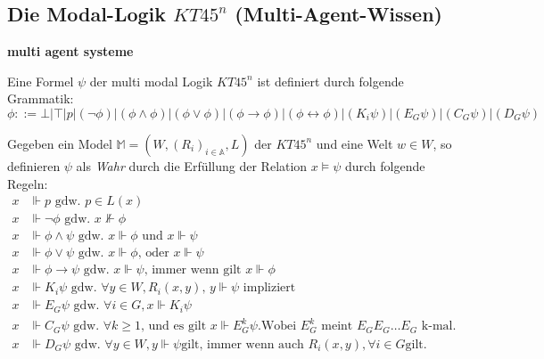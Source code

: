 
\subsection{Die Modal-Logik $KT45^n$ (Multi-Agent-Wissen)} %
\label{sub:the_modal_logic_kt45_n_}

\textbf{multi agent systeme}
\begin{definition}
	\label{def:bnf_kt45n}
	Eine Formel $\psi$ der multi modal Logik $KT45^n$ ist definiert durch folgende Grammatik:
	\begin{equation}
		\label{eqn:bnf_kt45n}
		\phi ::= \bot|\top|p|(\neg\phi)|(\phi\wedge\phi)|(\phi\vee\phi)|(\phi\rightarrow\phi)|
		(\phi\leftrightarrow\phi)|(K_i\psi)|(E_G\psi)|(C_G\psi)|(D_G\psi)
	\end{equation}
\end{definition}
\cite[S.335f]{huth2004logic}

\begin{definition}
		Gegeben ein Model $\mathds{M} = (W,(R_i)_{i \in \mathds{A}}, L)$ der $KT45^n$ und eine Welt $w \in W$, so definieren $\psi$ als \emph{Wahr} durch die Erfüllung der Relation $x \vDash \psi$ durch folgende Regeln:
		\begin{align}
			x &\Vdash p\text{ gdw. }p \in L(x)\\
			x &\Vdash \neg \phi\text{ gdw. }x \nVdash \phi\\
			x &\Vdash \phi \wedge \psi\text{ gdw. }x \Vdash \phi\text{ und } x \Vdash \psi\\
			x &\Vdash \phi \vee \psi\text{ gdw. }x \Vdash \phi \text{, oder } x \Vdash \psi\\
			x &\Vdash \phi \rightarrow \psi\text{ gdw. }x \Vdash \psi\text{, immer wenn gilt }x \Vdash \phi\\
			x &\Vdash K_i\psi \text{ gdw. } \forall y \in W, R_i(x,y) \text{, } y \Vdash \psi \text{ impliziert}\\
			x &\Vdash E_G\psi \text{ gdw. } \forall i \in G, x \Vdash K_i\psi\\
			x &\Vdash C_G\psi \text{ gdw. } \forall k \geq 1 \text{, und es gilt } x \Vdash E^k_G\psi \text{.} \text{Wobei } E^k_G \text{ meint } E_{G}E_{G}\dots E_{G} \text{ k-mal.}\\
			x &\Vdash D_G\psi \text{ gdw. } \forall y \in W, y \Vdash \psi \text{gilt, immer wenn auch } R_i(x,y), \forall i \in G \text{gilt.}\\
		\end{align}
\end{definition}
\cite[S.337]{huth2004logic}

